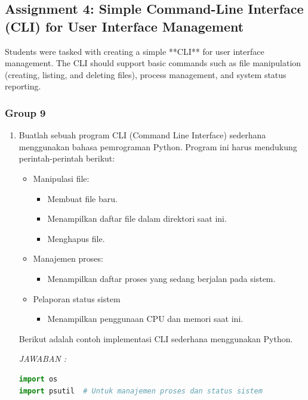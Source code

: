\documentclass[12pt]{article}
\begin{document}
\subsection{Assignment 4: Simple Command-Line Interface (CLI) for User Interface Management}
Students were tasked with creating a simple **CLI** for user interface management. The CLI should support basic commands such as file manipulation (creating, listing, and deleting files), process management, and system status reporting.

\subsubsection{Group 9}
\begin{enumerate}
    \item 

Buatlah sebuah program CLI (Command Line Interface) sederhana menggunakan bahasa pemrograman Python. Program ini harus mendukung perintah-perintah berikut:
\begin{itemize}
    \item Manipulasi file:
    \begin{itemize}
        \item Membuat file baru.
        \item Menampilkan daftar file dalam direktori saat ini.
        \item Menghapus file.
    \end{itemize}
    \item Manajemen proses:
    \begin{itemize}
        \item Menampilkan daftar proses yang sedang berjalan pada sistem.
    \end{itemize}
    \item Pelaporan status sistem
    \begin{itemize}
        \item Menampilkan penggunaan CPU dan memori saat ini.
    \end{itemize}
\end{itemize}
\newline 
Berikut adalah contoh implementasi CLI sederhana menggunakan Python.

\textit{JAWABAN : }
\begin{lstlisting}[language=Python, caption={Program CLI Sederhana}, label={lst:cli_program}, basicstyle=\ttfamily\small, keywordstyle=\color{blue}, commentstyle=\color{gray}]
import os
import psutil  # Untuk manajemen proses dan status sistem


\end{lstlisting}
\end{enumerate}
\end{document}

